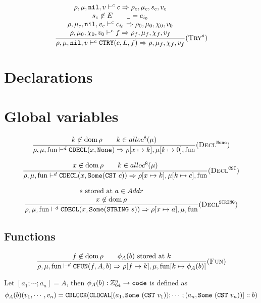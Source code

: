 \[\dfrac{\begin{array}{c}
    \rho,\mu,\texttt{nil},v \vdash^c c \Rightarrow \rho_c,\mu_c,s_c,v_c \\
    s_c \not\in E \qquad \texttt{\_} = e_{i_0} \\
    \rho,\mu_c,\texttt{nil},v_c \vdash^c c_{i_0} \Rightarrow \rho_0,\mu_0,\chi_0,v_0 \\
    \rho,\mu_0,\chi_0,v_0 \vdash^c f \Rightarrow \rho_f,\mu_f,\chi_f,v_f
\end{array}}{\rho,\mu,\texttt{nil},v \vdash^c \texttt{CTRY}(c, L, f) \Rightarrow \rho,\mu_f,\chi_f,v_f} (\textsc{Try}^s)\]

\section{Declarations}
\section{Global variables}

\[\dfrac{\begin{array}{c}
    k\not\in\operatorname{dom}\rho \qquad k \in alloc^8(\mu)
\end{array}}{\rho,\mu,\text{fun} \vdash^d \texttt{CDECL}(x, \texttt{None}) \Rightarrow \rho[x\mapsto k],\mu[k\mapsto 0],\text{fun}} (\textsc{Decl}^{\texttt{None}})\]

\[\dfrac{\begin{array}{c}
    x\not\in\operatorname{dom}\rho \qquad k \in alloc^8(\mu)
\end{array}}{\rho,\mu,\text{fun} \vdash^d \texttt{CDECL}(x, \texttt{Some}(\texttt{CST}\ c)) \Rightarrow \rho[x\mapsto k],\mu[k\mapsto c],\text{fun}} (\textsc{Decl}^{\texttt{CST}})\]

\[\dfrac{\begin{array}{c}
    s\text{ stored at }a\in Addr \\
    x\not\in\dom\rho \\
\end{array}}{\rho,\mu,\fun \gives^d \t{CDECL}(x, \t{Some}(\t{STRING}\ s)) \tto \rho[x\mapsto a],\mu,\fun} \rule{Decl}{^\t{STRING}}\]

\subsection{Functions}
\[\dfrac{\begin{array}{c}
    f\not\in\operatorname{dom}\rho \qquad \phi_A(b)\text{ stored at } k
\end{array}}{\rho,\mu,\text{fun} \vdash^d \texttt{CFUN}(f, A, b) \Rightarrow \rho[f\mapsto k],\mu,\text{fun}[k\mapsto \phi_A(b)]} (\textsc{Fun})\]

Let \([a_1; \cdots; a_n] = A\), then \(\phi_A(b): \mathbb{Z}_{64}^n\to \texttt{code}\) is defined as
\[\phi_A(b)(v_1, \cdots, v_n) = \texttt{CBLOCK}(\texttt{CLOCAL}[(a_1, \texttt{Some}\ (\texttt{CST}\ v_1)); \cdots; (a_n, \texttt{Some}\ (\texttt{CST}\ v_n))] :: b)\]


